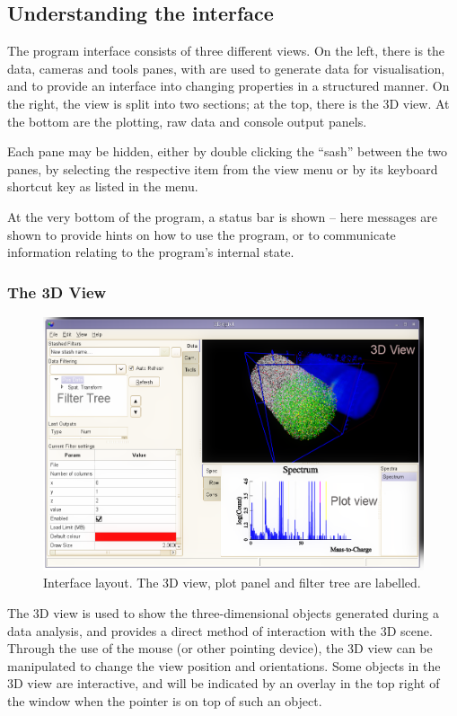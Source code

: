 \documentclass[10pt]{article}
\begin{document}
\subsection{Understanding the interface}
The program interface consists of three different views. On the left, there is the data, cameras and tools panes, with are used to generate data for visualisation, and to provide an interface into changing properties in a structured manner. On the right, the view is split into two sections; at the top, there is the 3D view. At the bottom are the plotting, raw data and console output panels.  

Each pane may be hidden, either by double clicking the ``sash'' between the two panes, by selecting the respective item from the view menu or by its keyboard shortcut key as listed in the menu.  

At the very bottom of the program, a status bar is shown -- here messages are shown to provide hints on how to use the program, or to communicate information relating to the program's internal state. 

\subsubsection{The 3D View}
\begin{figure}[ht]
  \centering
 \includegraphics[width=0.65 \textwidth,keepaspectratio=true]{./figures/interface.png}

 \caption{Interface layout. The 3D view, plot panel and filter tree are labelled.}
 \label{fig:interfaceLayout}
\end{figure}

The 3D view is used to show the three-dimensional objects generated during a data analysis, and provides a direct method of interaction with the 3D scene. Through the use of the mouse (or other pointing device), the 3D view can be manipulated to change the view position and orientations. Some objects in the 3D view are interactive, and will be indicated by an overlay in the top right of the window when the pointer is on top of such an object. 
\end{document}

